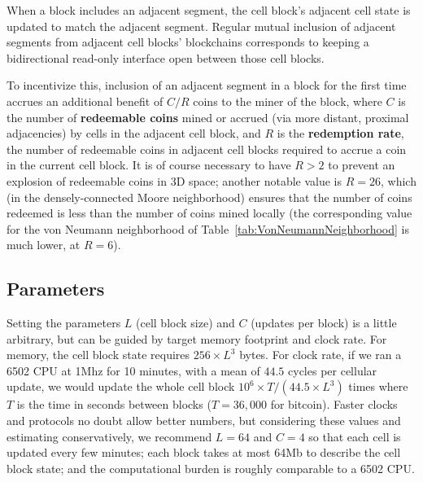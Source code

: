 \documentclass{article}
\begin{document}
When a block includes an adjacent segment, the cell block's adjacent cell state is updated to match the adjacent segment.
Regular mutual inclusion of adjacent segments from adjacent cell blocks' blockchains
corresponds to keeping a bidirectional read-only interface open between those cell blocks.

To incentivize this,
inclusion of an adjacent segment in a block for the first time
accrues an additional benefit of $C/R$ coins to the miner of the block,
where $C$ is the number of {\bf redeemable coins} mined or accrued (via more distant, proximal adjacencies)
by cells in the adjacent cell block,
and $R$ is the {\bf redemption rate}, the number of redeemable coins in adjacent cell blocks
required to accrue a coin in the current cell block.
It is of course necessary to have $R>2$ to prevent an explosion of redeemable coins in 3D space;
another notable value is $R=26$, which (in the densely-connected Moore neighborhood)
ensures that the number of coins redeemed is less than the number of coins mined locally
(the corresponding value for the von Neumann neighborhood of Table~\ref{tab:VonNeumannNeighborhood}
is much lower, at $R=6$).

\subsection{Parameters}

Setting the parameters $L$ (cell block size) and $C$ (updates per block)
is a little arbitrary, but can be guided by target memory footprint and clock rate.
For memory, the cell block state requires $256 \times L^3$ bytes.
For clock rate, if we ran a 6502 CPU at 1Mhz for 10 minutes, with a mean of $44.5$ cycles per cellular update,
we would update the whole cell block $10^6 \times T / (44.5 \times L^3)$ times
where $T$ is the time in seconds between blocks ($T=36,000$ for bitcoin).
Faster clocks and protocols no doubt allow better numbers,
but considering these values and estimating conservatively,
we recommend $L=64$ and $C=4$ so that
each cell is updated every few minutes;
each block takes at most 64Mb to describe the cell block state;
and the computational burden is roughly comparable to a 6502 CPU.

\newcommand\memtable[1]{
\begin{tabular}{lll}
  \hline
  From & To & Contents \\
  \hline
  #1
  \hline
\end{tabular}
}
\end{document}
